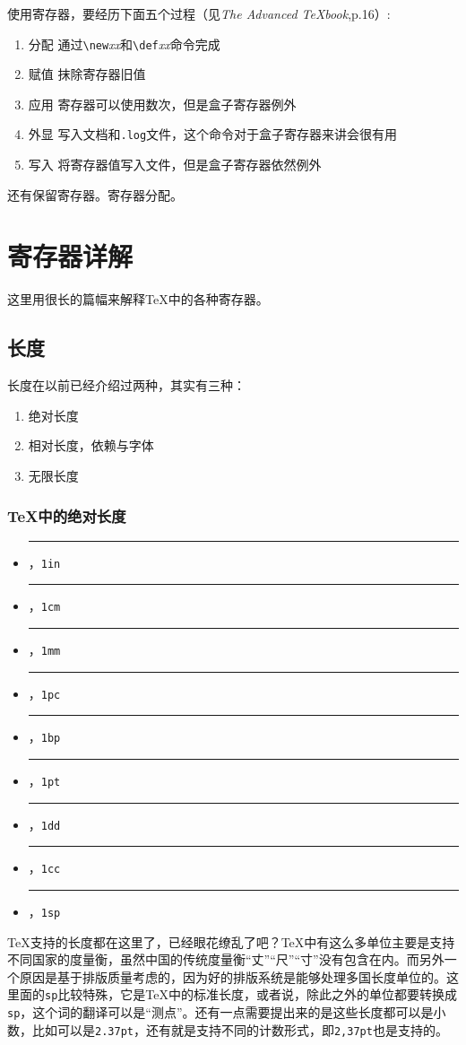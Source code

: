 \documentclass{article}
\newcommand{\TeXbook}{\textit{\TeX book}}
\begin{document}
使用寄存器，要经历下面五个过程（见\textit{The Advanced \TeXbook},p.16）:
\begin{enumerate}
\item {\hei 分配} 通过\verb!\new!\textit{xx}和\verb!\def!\textit{xx}命令完成
\item {\hei 赋值} 抹除寄存器旧值
\item {\hei 应用} 寄存器可以使用数次，但是盒子寄存器例外
\item {\hei 外显} 写入文档和\texttt{.log}文件，这个命令对于盒子寄存器来讲会很有用
\item {\hei 写入} 将寄存器值写入文件，但是盒子寄存器依然例外
\end{enumerate}

还有{\hei 保留寄存器}。寄存器分配。
\section{寄存器详解}
这里用很长的篇幅来解释\TeX 中的各种寄存器。
\subsection{长度}
长度在以前已经介绍过两种，其实有三种：
\begin{enumerate}
\item 绝对长度
\item 相对长度，依赖与字体
\item 无限长度
\end{enumerate}
\subsubsection{\TeX 中的绝对长度}
\begin{itemize}
\item \rule{1in}{1pt}，\verb!1in!
\item \rule{1cm}{1pt}，\verb!1cm!
\item \rule{1mm}{1pt}，\verb!1mm!
\item \rule{1pc}{1pt}，\verb!1pc!
\item \rule{1bp}{1pt}，\verb!1bp!
\item \rule{1pt}{1pt}，\verb!1pt!
\item \rule{1dd}{1pt}，\verb!1dd!
\item \rule{1cc}{1pt}，\verb!1cc!
\item \rule{1sp}{1pt}，\verb!1sp!
\end{itemize}

\TeX 支持的长度都在这里了，已经眼花缭乱了吧？\TeX 中有这么多单位主要是支持不同国家的度量衡，虽然中国的传统度量衡“丈”“尺”“寸”没有包含在内。而另外一个原因是基于排版质量考虑的，因为好的排版系统是能够处理多国长度单位的。这里面的\verb!sp!比较特殊，它是\TeX 中的标准长度，或者说，除此之外的单位都要转换成\verb!sp!，这个词的翻译可以是“测点”。还有一点需要提出来的是这些长度都可以是小数，比如可以是\verb!2.37pt!，还有就是支持不同的计数形式，即\verb!2,37pt!也是支持的。
\end{document}
